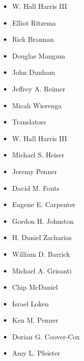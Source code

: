 \begin{multicols}{2}
\begin{headings}
\vspace{-\topsep}
\begin{itemize}
\setlength{\parskip}{0pt} \setlength{\itemsep}{0pt plus 1pt}
    \item W. Hall Harris III
    \item Elliot Ritzema
    \item Rick Brannan
    \item Douglas Mangum
    \item John Dunham
    \item Jeffrey A. Reimer
    \item Micah Wierenga
    \item Translators
    \item W. Hall Harris III
    \item Michael S. Heiser
    \item Jeremy Penner
    \item David M. Fouts
    \item Eugene E. Carpenter
    \item Gordon H. Johnston
    \item H. Daniel Zacharias
    \item William D. Barrick
    \item Michael A. Grisanti
    \item Chip McDaniel
    \item Israel Loken
    \item Ken M. Penner
    \item Dorian G. Coover-Cox
    \item Amy L. Pfeister
\end{itemize}

\vspace{-\topsep}
\end{headings}
\end{multicols}

